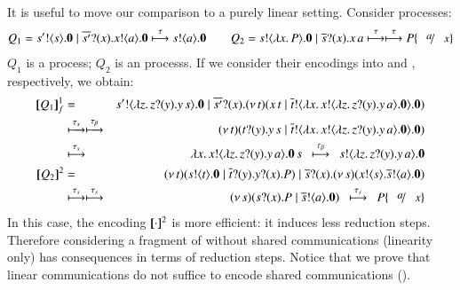 \documentclass[runningheads]{llncs}
\begin{document}
{It is useful to move our comparison 
to a purely linear setting. %
Consider processes:
\begin{eqnarray*}
	Q_1  =  \bout{s'}{s} \inact \Par \binp{\dual{s'}}{x} \bout{x}{a} \inact
	\hby{\tau}
	\bout{s}{a} \inact \qquad
	Q_2  =  \bout{s}{\abs{x}{P}} \inact \Par \binp{\dual{s}}{x} \appl{x}{a}
	\hby{\tau}
	\hby{\tau}
	P \subst{a}{x}
\end{eqnarray*}
$Q_1$ is a \sessp process; $Q_2$ is an \HO processs.
If we consider their encodings into \HO and \sessp, respectively,
we obtain:
\begin{eqnarray*}
	\map{Q_1}_f^{1} & = & \bout{s'}{\abs{z}{\binp{z}{y} \appl{y}{s}}} \inact \Par \binp{\dual{s'}}{x} \newsp{t}{\appl{x}{t} \Par \bout{\dual{t}}{\abs{x}{\bout{x}{\abs{z}{\binp{z}{y} \appl{y}{a}}} \inact}} \inact}\\
	& \hby{\stau} \hby{\btau}& 
	\newsp{t}{\binp{t}{y} \appl{y}{s} \Par \bout{\dual{t}}{\abs{x}{\bout{x}{\abs{z}{\binp{z}{y} \appl{y}{a}}} \inact}} \inact}\\
	& \hby{\stau} & 
	\appl{\abs{x}{\bout{x}{\abs{z}{\binp{z}{y} \appl{y}{a}}} \inact}}{s}
	~~\hby{\btau}~~
	\bout{s}{\abs{z}{\binp{z}{y} \appl{y}{a}}} \inact \\
	\pmap{Q_2}{2} & = & \newsp{t}{\bout{s}{t} \inact \Par \binp{\dual{t}}{y} \binp{y}{x} P} \Par \binp{\dual{s}}{x} \newsp{s}{\bout{x}{s} \bout{\dual{s}}{a} \inact}
	\\
	& \hby{\stau} \hby{\stau} & 
	\newsp{s}{\binp{s}{x} P \Par \bout{\dual{s}}{a} \inact}
	~~
	\hby{\stau} ~~
	P\subst{a}{x}
\end{eqnarray*}
\noi In this case, the encoding $[\!\![\cdot]\!\!]^2$ is more efficient: it induces less reduction steps.
Therefore considering a fragment of \HOp without shared communications (linearity only)
has consequences in terms of reduction steps. Notice that we prove that linear communications do 
not suffice to encode shared communications ().

}
\end{document}
